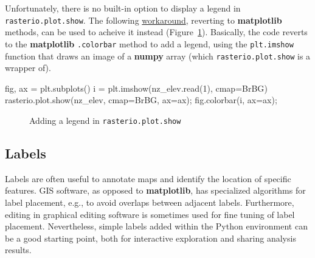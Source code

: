 \documentclass[
  letterpaper,
]{krantz}
\newenvironment{Shaded}{\begin{snugshade}}{\end{snugshade}}
\newcommand{\DecValTok}[1]{\textcolor[rgb]{0.68,0.00,0.00}{#1}}
\newcommand{\NormalTok}[1]{\textcolor[rgb]{0.00,0.23,0.31}{#1}}
\newcommand{\OperatorTok}[1]{\textcolor[rgb]{0.37,0.37,0.37}{#1}}
\newcommand{\StringTok}[1]{\textcolor[rgb]{0.13,0.47,0.30}{#1}}
\begin{document}
Unfortunately, there is no built-in option to display a legend in
\texttt{rasterio.plot.show}. The following
\href{https://stackoverflow.com/questions/61327088/rio-plot-show-with-colorbar}{workaround},
reverting to \textbf{matplotlib} methods, can be used to acheive it
instead (Figure~\ref{fig-plot-symbology-colors-r-scale}). Basically, the
code reverts to the \textbf{matplotlib} \texttt{.colorbar} method to add
a legend, using the \texttt{plt.imshow} function that draws an image of
a \textbf{numpy} array (which \texttt{rasterio.plot.show} is a wrapper
of).

\begin{Shaded}
\begin{Highlighting}[]
\NormalTok{fig, ax }\OperatorTok{=}\NormalTok{ plt.subplots()}
\NormalTok{i }\OperatorTok{=}\NormalTok{ plt.imshow(nz\_elev.read(}\DecValTok{1}\NormalTok{), cmap}\OperatorTok{=}\StringTok{\textquotesingle{}BrBG\textquotesingle{}}\NormalTok{)}
\NormalTok{rasterio.plot.show(nz\_elev, cmap}\OperatorTok{=}\StringTok{\textquotesingle{}BrBG\textquotesingle{}}\NormalTok{, ax}\OperatorTok{=}\NormalTok{ax)}\OperatorTok{;}
\NormalTok{fig.colorbar(i, ax}\OperatorTok{=}\NormalTok{ax)}\OperatorTok{;}
\end{Highlighting}
\end{Shaded}

\begin{figure}[H]


\caption{\label{fig-plot-symbology-colors-r-scale}Adding a legend in
\texttt{rasterio.plot.show}}

\end{figure}%

\subsection{Labels}\label{sec-plot-static-labels}

Labels are often useful to annotate maps and identify the location of
specific features. GIS software, as opposed to \textbf{matplotlib}, has
specialized algorithms for label placement, e.g., to avoid overlaps
between adjacent labels. Furthermore, editing in graphical editing
software is sometimes used for fine tuning of label placement.
Nevertheless, simple labels added within the Python environment can be a
good starting point, both for interactive exploration and sharing
analysis results.
\end{document}
